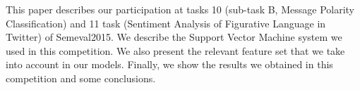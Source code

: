 This paper describes our participation at tasks 10 (sub-task B, Message Polarity Classification) and 11 task (Sentiment Analysis of Figurative Language in Twitter) of Semeval2015. We describe the Support Vector Machine system we used in this competition. We also present the relevant feature set that we take into account in our models. Finally, we show the results we obtained in this competition and some conclusions.
